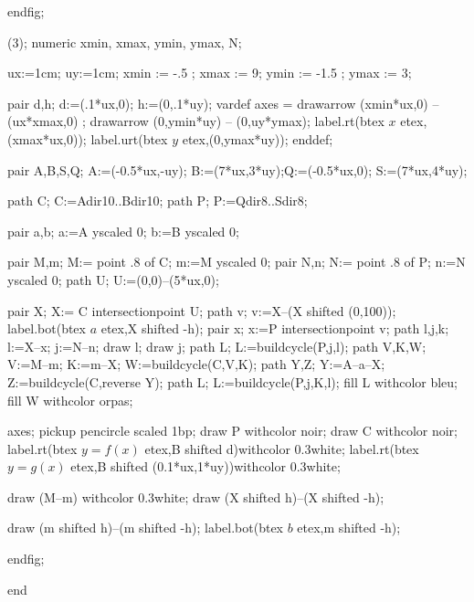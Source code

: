 \documentclass[12pt]{article}
\begin{document}
endfig;


\beginfig(3);
  numeric xmin, xmax, ymin, ymax, N;

  ux:=1cm;  uy:=1cm;
  xmin := -.5 ; xmax := 9;
  ymin := -1.5 ; ymax := 3;


  pair d,h;
  d:=(.1*ux,0);
  h:=(0,.1*uy);
  vardef axes =
   drawarrow (xmin*ux,0) -- (ux*xmax,0) ; %
   drawarrow (0,ymin*uy) -- (0,uy*ymax); %
   label.rt(btex $x$ etex,(xmax*ux,0)); %
   label.urt(btex $y$ etex,(0,ymax*uy)); %
  enddef;


pair A,B,S,Q; A:=(-0.5*ux,-uy); B:=(7*ux,3*uy);Q:=(-0.5*ux,0); S:=(7*ux,4*uy);

path C; C:=A{dir10}..B{dir10};
path P; P:=Q{dir8}..S{dir8};

pair     a,b; a:=A yscaled 0; b:=B yscaled 0;


pair M,m; M:= point .8 of C; m:=M yscaled 0;
pair N,n; N:= point .8 of P; n:=N yscaled 0;
path U; U:=(0,0)--(5*ux,0);

pair X; X:= C intersectionpoint U;
path v; v:=X--(X shifted (0,100));
label.bot(btex $a$ etex,X shifted -h);
pair x; x:=P intersectionpoint v;
path l,j,k; l:=X--x; j:=N--n;
draw l; draw j;
path L; L:=buildcycle(P,j,l);
path V,K,W; V:=M--m; K:=m--X; W:=buildcycle(C,V,K);
path Y,Z; Y:=A--a--X; Z:=buildcycle(C,reverse Y);
path L; L:=buildcycle(P,j,K,l);
fill L withcolor bleu;
fill W withcolor orpas; 

axes;
pickup  pencircle scaled 1bp;
draw P withcolor noir;
draw C withcolor noir; label.rt(btex $y=f(x)$ etex,B shifted d)withcolor 0.3white;
label.rt(btex $y=g(x)$ etex,B shifted (0.1*ux,1*uy))withcolor 0.3white;



draw (M--m)  withcolor 0.3white;
draw (X shifted h)--(X shifted -h); 

 draw (m shifted h)--(m shifted -h); label.bot(btex $b$ etex,m shifted -h);





endfig;

end
\end{document}
